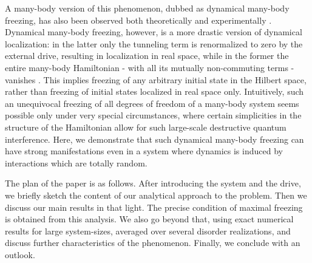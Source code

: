 \documentclass[reprint,preprintnumbers,showpacs,amsmath,twocolumn,showkeys,aps,prl]{revtex4-1}
\begin{document}
A many-body version of this phenomenon, dubbed as dynamical many-body 
freezing, has also been observed both theoretically 
\cite{AD-DQH,SB-AD-SDG,AD-RM,Russomanno,Anatoli-Periodic,Sei-Book} 
and experimentally \cite{DMF-IISER-Exp}. Dynamical many-body freezing, however, is a 
more drastic version of dynamical localization: in the latter only the tunneling term is 
renormalized to zero by the external drive, resulting in 
localization in real space, while in the former the entire many-body Hamiltonian - with all its mutually
non-commuting terms - vanishes \cite{AD-DQH}. This implies 
freezing of any arbitrary initial state in the Hilbert space, rather than freezing of initial 
states localized in real space only. Intuitively, such an unequivocal freezing of all degrees of freedom 
of a many-body system seems possible only under very special circumstances, where certain simplicities in the structure of the Hamiltonian allow for such large-scale destructive quantum interference. Here, we demonstrate that such dynamical 
many-body freezing can have strong manifestations even in a system where dynamics 
is induced by interactions which are totally random.

The plan of the paper is as follows. After introducing the system and the drive, we briefly
sketch the content of our analytical approach to the problem. Then we discuss our main 
results in that light. The precise condition of maximal freezing is obtained from this
analysis. We also go beyond that, using exact numerical results for large system-sizes, averaged
over several disorder realizations, and discuss further characteristics of the phenomenon. 
Finally, we conclude with an outlook.
\end{document}
